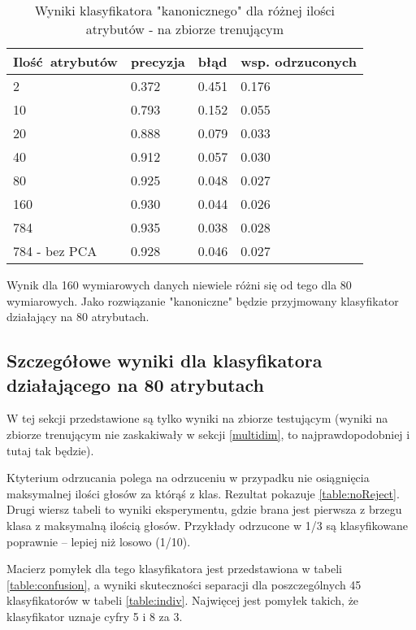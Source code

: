 \documentclass[a4paper]{article}
\begin{document}
\begin{table}[H]
    \caption{Wyniki klasyfikatora "kanonicznego" dla różnej ilości atrybutów - na zbiorze trenującym
    \label{table:attrCountTrain}
    }
\begin{center}
    \begin{tabular}{| l | l | l | l |}
    \hline
        Ilość atrybutów & precyzja & błąd & wsp. odrzuconych \\
    \hline
        2  & 0.372 & 0.451 & 0.176 \\
        10 & 0.793 & 0.152 & 0.055 \\
        20 & 0.888 & 0.079 & 0.033 \\
        40 & 0.912 & 0.057 & 0.030 \\
        80 & 0.925 & 0.048 & 0.027 \\
        160& 0.930 & 0.044 & 0.026 \\
        784& 0.935 & 0.038 & 0.028 \\
        784 - bez PCA & 0.928 & 0.046 & 0.027 \\
    \hline
    \end{tabular}
\end{center}
\end{table}

Wynik dla 160 wymiarowych danych niewiele różni się od tego dla 80 wymiarowych.
Jako rozwiązanie "kanoniczne" będzie przyjmowany klasyfikator działający na 80 atrybutach.

\subsection{Szczegółowe wyniki dla klasyfikatora działającego na 80 atrybutach}

W tej sekcji przedstawione są tylko wyniki na zbiorze testującym
(wyniki na zbiorze trenującym nie zaskakiwały w sekcji \ref{multidim}, to najprawdopodobniej i tutaj tak będzie).

Ktyterium odrzucania polega na odrzuceniu w przypadku nie osiągnięcia maksymalnej ilości głosów za którąś z klas.
Rezultat pokazuje \ref{table:noReject}.
Drugi wiersz tabeli to wyniki eksperymentu, gdzie brana jest pierwsza z brzegu klasa z maksymalną ilością głosów.
Przykłady odrzucone w 1/3 są klasyfikowane poprawnie -- lepiej niż losowo (1/10).


Macierz pomyłek dla tego klasyfikatora jest przedstawiona w tabeli \ref{table:confusion},
a wyniki skuteczności separacji dla poszczególnych 45 klasyfikatorów w tabeli \ref{table:indiv}.
Najwięcej jest pomyłek takich, że klasyfikator uznaje cyfry 5 i 8 za 3.
\end{document}
